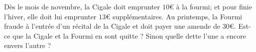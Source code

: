 
\begin{exercice}\label{exo2smath-0086}

    Dès le mois de novembre, la Cigale doit emprunter \( 10\)€ à la fourmi; et pour finie l'hiver, elle doit lui emprunter \( 13\)€ supplémentaires. Au printemps, la Fourmi fraude à l'entrée d'un récital de la Cigale et doit payer une amende de \( 30\)€. Est-ce que la Cigale et la Fourmi en sont quitte ? Sinon quelle dette l'une a encore envers l'autre ?

\end{exercice}
